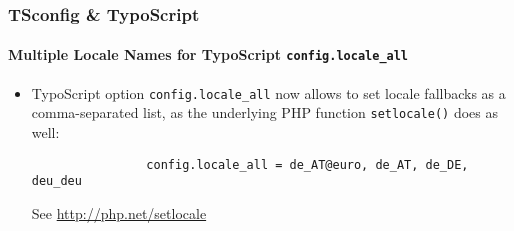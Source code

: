 \begin{frame}[fragile]
	\frametitle{TSconfig \& TypoScript}
	\framesubtitle{Multiple Locale Names for TypoScript \texttt{config.locale\_all}}

	\lstset{basicstyle=\small\ttfamily}

	\begin{itemize}

		\item TypoScript option \texttt{config.locale\_all} now allows to
			set locale fallbacks as a comma-separated list, as the underlying
			PHP function \texttt{setlocale()} does as well:

			\begin{lstlisting}
				config.locale_all = de_AT@euro, de_AT, de_DE, deu_deu
			\end{lstlisting}

			See \url{http://php.net/setlocale}

	\end{itemize}

\end{frame}

